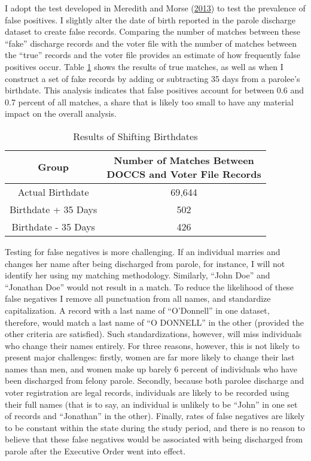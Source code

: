 \documentclass[
  12pt,
]{article}
\begin{document}
I adopt the test developed in Meredith and Morse (\protect\hyperlink{ref-Meredith2013}{2013}) to test the prevalence of false positives. I slightly alter the date of birth reported in the parole discharge dataset to create false records. Comparing the number of matches between these ``fake'' discharge records and the voter file with the number of matches between the ``true'' records and the voter file provides an estimate of how frequently false positives occur. Table \ref{tab:change-dobs} shows the results of true matches, as well as when I construct a set of fake records by adding or subtracting 35 days from a parolee's birthdate. This analysis indicates that false positives account for between 0.6 and 0.7 percent of all matches, a share that is likely too small to have any material impact on the overall analysis.

\begin{singlespace}
\begin{table}[H]

\caption{\label{tab:shift-dobs-chunk}\label{tab:change-dobs} Results of Shifting Birthdates}
\centering
\begin{tabular}[t]{cc}
\toprule
Group & \makecell[l]{Number of Matches Between\\DOCCS and Voter File Records}\\
\midrule
Actual Birthdate & 69,644\\
Birthdate + 35 Days & 502\\
Birthdate - 35 Days & 426\\
\bottomrule
\end{tabular}
\end{table}
\end{singlespace}

Testing for false negatives is more challenging. If an individual marries and changes her name after being discharged from parole, for instance, I will not identify her using my matching methodology. Similarly, ``John Doe'' and ``Jonathan Doe'' would not result in a match. To reduce the likelihood of these false negatives I remove all punctuation from all names, and standardize capitalization. A record with a last name of ``O'Donnell'' in one dataset, therefore, would match a last name of ``O DONNELL'' in the other (provided the other criteria are satisfied). Such standardizations, however, will miss individuals who change their names entirely. For three reasons, however, this is not likely to present major challenges: firstly, women are far more likely to change their last names than men, and women make up barely 6 percent of individuals who have been discharged from felony parole. Secondly, because both parolee discharge and voter registration are legal records, individuals are likely to be recorded using their full names (that is to say, an individual is unlikely to be ``John'' in one set of records and ``Jonathan'' in the other). Finally, rates of false negatives are likely to be constant within the state during the study period, and there is no reason to believe that these false negatives would be associated with being discharged from parole after the Executive Order went into effect.
\end{document}
